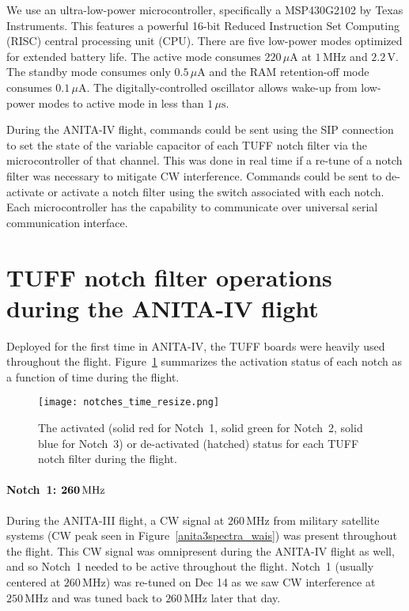 \documentclass[preprint,12pt]{elsarticle}
\begin{document}
We use an ultra-low-power microcontroller, specifically a MSP430G2102 by Texas Instruments.
This features a powerful 16-bit Reduced Instruction Set Computing (RISC) central processing unit (CPU). 
There are five low-power modes optimized for extended battery life. 
The active mode consumes $220\,\mu\mbox{A}$ at $1\,\mbox{MHz}$ and $2.2\,\mathrm{V}$. 
The standby mode consumes only $0.5\,\mu\mbox{A}$ and the RAM retention-off mode consumes $0.1\,\mu\mbox{A}$.
The digitally-controlled oscillator allows wake-up from low-power modes to active mode in less than 
$1\,\mu\mbox{s}$. 

During the ANITA-IV flight, commands could be sent using the SIP connection to set the 
state of the variable capacitor of each TUFF notch filter via the microcontroller 
of that channel. 
This was done in real time if a re-tune of a notch filter was necessary to mitigate CW interference.
Commands could be sent to de-activate or activate a notch filter using the switch associated with each notch. 
Each microcontroller has the capability to communicate over universal serial communication interface.

\section{TUFF notch filter operations during the ANITA-IV flight}

Deployed for the first time in ANITA-IV, the TUFF boards 
were heavily used throughout the flight.
Figure~\ref{notches_time} summarizes the activation status of each notch as a function of time during the flight. 

\begin{figure}[H]
\centering
\texttt{[image: notches\_time\_resize.png]}
\caption{The activated (solid red for Notch~1, solid green for Notch~2, solid blue for Notch~3) 
or de-activated (hatched) status for each TUFF notch filter during the flight. 
}
\label{notches_time}
\end{figure}

\paragraph{Notch~1: $\bold{260}\,\mbox{MHz}$}

During the ANITA-III flight, 
a CW signal at $260\,\mbox{MHz}$ from military satellite systems 
(CW peak seen in Figure~\ref{anita3spectra_wais}) was present throughout the flight. 
This CW signal was omnipresent during the ANITA-IV flight as well, and so Notch~1 needed to be 
active throughout the flight. Notch~1 (usually centered at $260\,\mbox{MHz}$) was re-tuned on Dec 14 as we saw CW interference at 
$250\,\mbox{MHz}$ and was tuned back to $260\,\mbox{MHz}$ later that day. 
\end{document}
